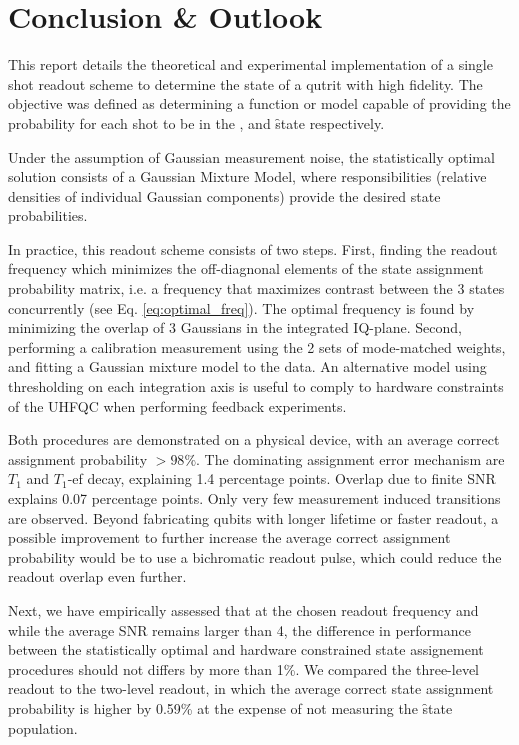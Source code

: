 \section{Conclusion \& Outlook}
This  report  details  the  theoretical  and  experimental  implementation  of  a  single  shot  readout scheme to determine the state of a qutrit with high fidelity. The objective was defined as determining a function or model capable of providing the probability for each shot to be in the \g, \e and \f state respectively. 

Under the assumption of Gaussian measurement noise, the statistically optimal solution consists of a Gaussian Mixture Model, where responsibilities (relative densities of individual Gaussian components) provide the desired state probabilities. 

In practice, this readout scheme consists of two steps. First, finding the readout frequency which minimizes the off-diagnonal elements of the state assignment probability matrix, i.e. a frequency that maximizes contrast between the 3 states concurrently (see Eq. \eqref{eq:optimal_freq}). The optimal frequency is found by minimizing the overlap of 3 Gaussians in the integrated IQ-plane.
Second, performing a calibration measurement using the 2 sets of mode-matched weights, and fitting a Gaussian mixture model to the data. An alternative model using thresholding on each integration axis is useful to comply to hardware constraints of the UHFQC when performing feedback experiments. 

Both procedures are demonstrated on a physical device, with an average correct assignment probability $> 98\%$. The dominating assignment error mechanism are $T_1$ and $T_1$-ef decay, explaining 1.4 percentage points. Overlap due to finite SNR explains 0.07 percentage points. Only very few measurement induced transitions are observed. Beyond fabricating qubits with longer lifetime or faster readout, a possible improvement to further increase the average correct assignment probability would be to use a bichromatic readout pulse, which could reduce the readout overlap even further. 

Next, we have empirically assessed that at the chosen readout frequency and while the average SNR remains larger than 4, the difference in performance between the statistically optimal and hardware constrained state assignement procedures should not differs by more than 1\%. We compared the three-level readout to the two-level readout, in which the average correct state assignment probability is higher by 0.59\% at the expense of not measuring the \f state population.

